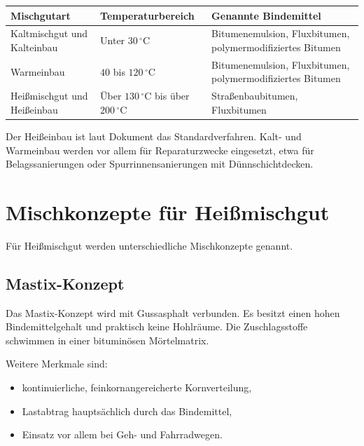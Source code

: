 \documentclass[
  12pt,
  a4paper,
  oneside
]{scrreprt}
\begin{document}
\begin{longtable}{
  >{\raggedright\arraybackslash}p{}
  >{\centering\arraybackslash}p{}
  >{\raggedright\arraybackslash}p{}
}
\toprule
\textbf{Mischgutart} &
\textbf{Temperaturbereich} &
\textbf{Genannte Bindemittel} \\
\midrule
\endhead

Kaltmischgut und Kalteinbau &
Unter $30\,^\circ\mathrm{C}$ &
Bitumenemulsion, Fluxbitumen, polymermodifiziertes Bitumen \\

Warmeinbau &
$40$ bis $120\,^\circ\mathrm{C}$ &
Bitumenemulsion, Fluxbitumen, polymermodifiziertes Bitumen \\

Heißmischgut und Heißeinbau &
Über $130\,^\circ\mathrm{C}$ bis über $200\,^\circ\mathrm{C}$ &
Straßenbaubitumen, Fluxbitumen \\

\bottomrule
\end{longtable}



Der Heißeinbau ist laut Dokument das Standardverfahren. Kalt- und
Warmeinbau werden vor allem für Reparaturzwecke eingesetzt, etwa für
Belagssanierungen oder Spurrinnensanierungen mit Dünnschichtdecken.


\section{Mischkonzepte für Heißmischgut}

Für Heißmischgut werden unterschiedliche Mischkonzepte genannt.

\subsection{Mastix-Konzept}

Das Mastix-Konzept wird mit Gussasphalt verbunden. Es besitzt einen
hohen Bindemittelgehalt und praktisch keine Hohlräume. Die
Zuschlagsstoffe schwimmen in einer bituminösen Mörtelmatrix.


Weitere Merkmale sind:

\begin{itemize}
  \item kontinuierliche, feinkornangereicherte Kornverteilung,
  \item Lastabtrag hauptsächlich durch das Bindemittel,
  \item Einsatz vor allem bei Geh- und Fahrradwegen.
\end{itemize}
\end{document}
